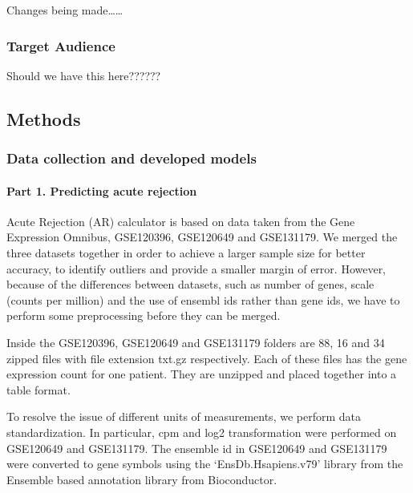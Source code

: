 \documentclass[a4paper,9pt,twocolumn,twoside,]{pinp}
\begin{document}
Changes being made\ldots{}\ldots{}

\hypertarget{target-audience}{%
\subsubsection{Target Audience}\label{target-audience}}

Should we have this here??????

\hypertarget{methods}{%
\subsection{Methods}\label{methods}}

\hypertarget{data-collection-and-developed-models}{%
\subsubsection{Data collection and developed
models}\label{data-collection-and-developed-models}}

\hypertarget{part-1.-predicting-acute-rejection}{%
\paragraph{Part 1. Predicting acute
rejection}\label{part-1.-predicting-acute-rejection}}

Acute Rejection (AR) calculator is based on data taken from the Gene
Expression Omnibus, GSE120396, GSE120649 and GSE131179. We merged the
three datasets together in order to achieve a larger sample size for
better accuracy, to identify outliers and provide a smaller margin of
error. However, because of the differences between datasets, such as
number of genes, scale (counts per million) and the use of ensembl ids
rather than gene ids, we have to perform some preprocessing before they
can be merged.

Inside the GSE120396, GSE120649 and GSE131179 folders are 88, 16 and 34
zipped files with file extension txt.gz respectively. Each of these
files has the gene expression count for one patient. They are unzipped
and placed together into a table format.

To resolve the issue of different units of measurements, we perform data
standardization. In particular, cpm and log2 transformation were
performed on GSE120649 and GSE131179. The ensemble id in GSE120649 and
GSE131179 were converted to gene symbols using the `EnsDb.Hsapiens.v79'
library from the Ensemble based annotation library from Bioconductor.
\end{document}
